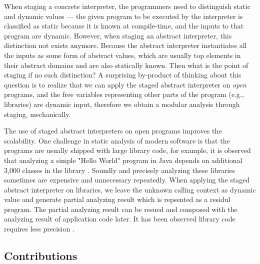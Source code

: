 When staging a concrete interpreter, the programmers need to distinguish 
static and dynamic values --- the given program to be executed by the 
interpreter is classified as static because it is known at compile-time, 
and the inputs to that program are dynamic.  However, when staging an 
abstract interpreter, this distinction not exists anymore. Because the 
abstract interpreter instantiates all the inputs as some form of abstract 
values, which are usually top elements in their abstract domains and are 
also statically known. Then what is the point of staging if no such distinction?
A surprising by-product of thinking about this question is to realize that 
we can apply the staged abstract interpreter on \textit{open} programs, and
the free variables representing other parts of the program (e.g., libraries) 
are dynamic input, therefore we obtain a modular analysis through staging, 
mechanically. 

The use of staged abstract interpreters on open programs improves the scalability.
One challenge in static analysis of modern software is that the programs are usually 
shipped with large library code, for example, it is observed that analyzing a simple
"Hello World" program in Java depends on additional 3,000 classes in the library \cite{DBLP:conf/oopsla/KulkarniMZN16}.
Soundly and precisely analyzing these libraries sometimes are expensive and unnecessary repeatedly.
When applying the staged abstract interpreter on libraries, we leave the unknown 
calling context as dynamic value and generate partial analyzing result which is 
repsented as a residul program. The partial analyzing result can be resued and composed
with the analyzing result of application code later. 
It has been observed library code requires less precision .


\subsection{Contributions}

